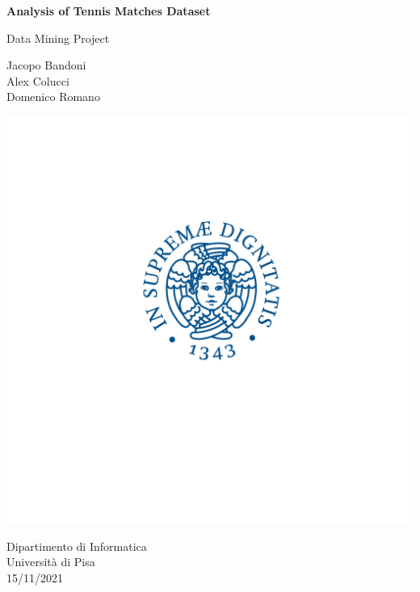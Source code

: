 \begin{titlepage}
    
    \begin{center}
        \vspace*{1cm}
            
        \Huge
        \textbf{Analysis of Tennis Matches Dataset}
            
        \vspace{0.5cm}
        \LARGE
        Data Mining Project
            
        \vspace{1.5cm}
            
        Jacopo Bandoni\\
        Alex Colucci\\
        Domenico Romano\\
            
        \vfill
            
        \includegraphics[width = 450 px]{logo_unipi.png}
        
            
            
        \Large
        Dipartimento di Informatica\\
        Università di Pisa\\
        15/11/2021
            
    \end{center}
\end{titlepage}